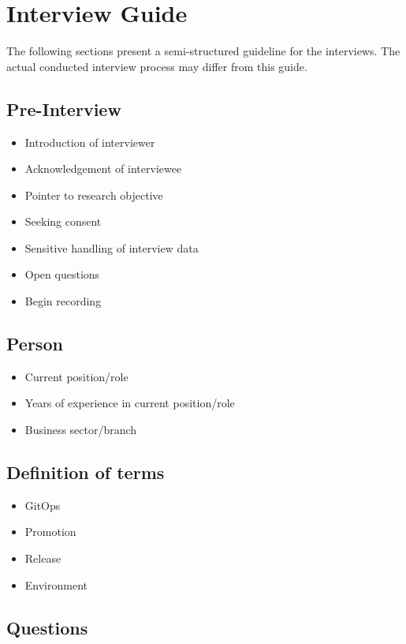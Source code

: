 \chapter{Interview Guide}\label{appendix:interview-guide}

The following sections present a semi-structured guideline for the interviews.
The actual conducted interview process may differ from this guide.

\section{Pre-Interview}

\begin{itemize}
	\item Introduction of interviewer
	\item Acknowledgement of interviewee
	\item Pointer to research objective
	\item Seeking consent
	\item Sensitive handling of interview data
	\item Open questions
	\item Begin recording
\end{itemize}

\section{Person}

\begin{itemize}
	\item Current position/role
	\item Years of experience in current position/role
	\item Business sector/branch
\end{itemize}

\section{Definition of terms}

\begin{itemize}
	\item GitOps
	\item Promotion
	\item Release
	\item Environment
\end{itemize}

\clearpage

\section{Questions}\label{appendix:interview-questions}

